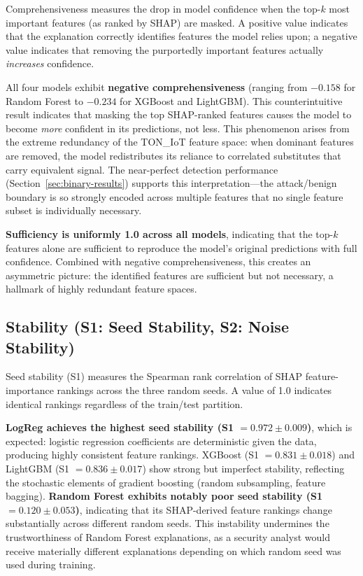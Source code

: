 \documentclass[12pt,a4paper]{report}
\begin{document}
Comprehensiveness measures the drop in model confidence when the top-$k$ most important features (as ranked by SHAP) are masked. A positive value indicates that the explanation correctly identifies features the model relies upon; a negative value indicates that removing the purportedly important features actually \emph{increases} confidence.

All four models exhibit \textbf{negative comprehensiveness} (ranging from $-0.158$ for Random Forest to $-0.234$ for XGBoost and LightGBM). This counterintuitive result indicates that masking the top SHAP-ranked features causes the model to become \emph{more} confident in its predictions, not less. This phenomenon arises from the extreme redundancy of the TON\_IoT feature space: when dominant features are removed, the model redistributes its reliance to correlated substitutes that carry equivalent signal. The near-perfect detection performance (Section~\ref{sec:binary-results}) supports this interpretation---the attack/benign boundary is so strongly encoded across multiple features that no single feature subset is individually necessary.

\textbf{Sufficiency is uniformly 1.0 across all models}, indicating that the top-$k$ features alone are sufficient to reproduce the model's original predictions with full confidence. Combined with negative comprehensiveness, this creates an asymmetric picture: the identified features are sufficient but not necessary, a hallmark of highly redundant feature spaces.

\subsection{Stability (S1: Seed Stability, S2: Noise Stability)}
\label{sec:stab-results}

Seed stability (S1) measures the Spearman rank correlation of SHAP feature-importance rankings across the three random seeds. A value of 1.0 indicates identical rankings regardless of the train/test partition.

\textbf{LogReg achieves the highest seed stability (S1 $= 0.972 \pm 0.009$)}, which is expected: logistic regression coefficients are deterministic given the data, producing highly consistent feature rankings. XGBoost (S1 $= 0.831 \pm 0.018$) and LightGBM (S1 $= 0.836 \pm 0.017$) show strong but imperfect stability, reflecting the stochastic elements of gradient boosting (random subsampling, feature bagging). \textbf{Random Forest exhibits notably poor seed stability (S1 $= 0.120 \pm 0.053$)}, indicating that its SHAP-derived feature rankings change substantially across different random seeds. This instability undermines the trustworthiness of Random Forest explanations, as a security analyst would receive materially different explanations depending on which random seed was used during training.
\end{document}
